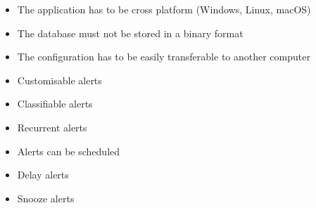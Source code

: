\begin{itemize}
\item The application has to be cross platform (Windows, Linux, macOS)
\item The database must not be stored in a binary format
\item The configuration has to be easily transferable to another computer
\item Customisable alerts
\item Classifiable alerts
\item Recurrent alerts
\item Alerts can be scheduled
\item Delay alerts
\item Snooze alerts
\end{itemize}